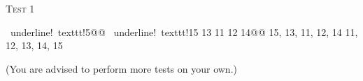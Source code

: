 
\textsc{Test 1}
\begin{console}[commandchars=\~\!\@]
~underline!~texttt!5@@
~underline!~texttt!15 13 11 12 14@@
{15, 13, 11, 12, 14}
{11, 12, 13, 14, 15}
\end{console}
(You are advised to perform more tests on your own.)
